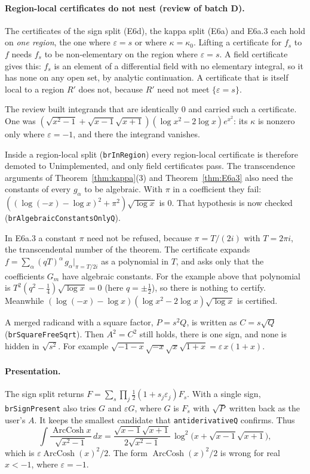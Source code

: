 \documentclass[11pt]{article}
\theoremstyle{definition}
\theoremstyle{remark}
\newcommand{\code}[1]{\texttt{#1}}
\begin{document}
\paragraph{Region-local certificates do not nest (review of batch D).} The
certificates of the sign split (E6d), the kappa split (E6a) and E6a.3 each hold
on \emph{one region}, the one where $\varepsilon=s$ or where $\kappa=\kappa_0$.
Lifting a certificate for $f_s$ to $f$ needs $f_s$ to be non-elementary on the
region where $\varepsilon=s$. A field certificate gives this: $f_s$ is an element
of a differential field with no elementary integral, so it has none on any
open set, by analytic continuation. A certificate that is itself local to a
region $R'$ does not, because $R'$ need not meet $\{\varepsilon=s\}$.

The review built integrands that are identically $0$ and carried such a
certificate. One was
$(\sqrt{x^2-1}+\sqrt{x-1}\sqrt{x+1})(\log x^2-2\log x)e^{x^2}$: its $\kappa$ is
nonzero only where $\varepsilon=-1$, and there the integrand vanishes.

Inside a region-local split (\code{brInRegion}) every region-local certificate
is therefore demoted to Unimplemented, and only field certificates pass. The
transcendence arguments of Theorem~\ref{thm:kappa}(3) and
Theorem~\ref{thm:E6a3} also need the constants of every $g_\alpha$ to be
algebraic. With $\pi$ in a coefficient they fail:
$((\log(-x)-\log x)^2+\pi^2)\sqrt{\log x}$ is $0$. That hypothesis is now
checked (\code{brAlgebraicConstantsOnlyQ}).

In E6a.3 a constant $\pi$ need not be refused, because $\pi=T/(2i)$ with
$T=2\pi i$, the transcendental number of the theorem. The certificate expands
$f=\sum_\alpha(qT)^\alpha\,g_\alpha|_{\pi=T/2i}$ as a polynomial in $T$, and
asks only that the coefficients $G_m$ have algebraic constants. For the
example above that polynomial is
$T^2(q^2-\tfrac14)\sqrt{\log x}=0$ (here $q=\pm\tfrac12$), so there is nothing
to certify. Meanwhile
$(\log(-x)-\log x)(\log x^2-2\log x)\sqrt{\log x}$ is certified.

A merged radicand with a square factor, $P=s^2Q$, is written as
$C=s\sqrt Q$ (\code{brSquareFreeSqrt}). Then $A^2=C^2$ still holds, there is
one sign, and none is hidden in $\sqrt{s^2}$. For example
$\sqrt{-1-x}\sqrt{-x}\sqrt x\sqrt{1+x}=\varepsilon\,x(1+x)$.

\paragraph{Presentation.} The sign split returns
$F=\sum_s\prod_j\tfrac12(1+s_j\varepsilon_j)F_s$. With a single sign,
\code{brSignPresent} also tries $G$ and $\varepsilon G$, where $G$ is $F_s$
with $\sqrt P$ written back as the user's $A$. It keeps the smallest candidate
that \code{antiderivativeQ} confirms. Thus
\[ \int\frac{\operatorname{ArcCosh}x}{\sqrt{x^2-1}}\,dx
   =\frac{\sqrt{x-1}\sqrt{x+1}}{2\sqrt{x^2-1}}\,
     \log^2\!\bigl(x+\sqrt{x-1}\sqrt{x+1}\bigr), \]
which is $\varepsilon\operatorname{ArcCosh}(x)^2/2$. The form
$\operatorname{ArcCosh}(x)^2/2$ is wrong for real $x<-1$, where $\varepsilon=-1$.
\end{document}
